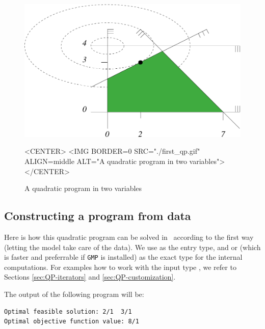\begin{figure}[htbp]
\begin{ccTexOnly}
\begin{center}
\includegraphics{QP_solver/first_qp} %
\end{center}
\end{ccTexOnly}

\begin{ccHtmlOnly}
<CENTER>
<IMG BORDER=0 SRC="./first_qp.gif" ALIGN=middle ALT="A quadratic program in two variables">
</CENTER>
\end{ccHtmlOnly}

\caption{A quadratic program in two variables
\label{fig:QP-first_qp}}
\end{figure}

\subsection{Constructing a program from data}
Here is how this quadratic program can be solved in \cgal\ 
according to the first way (letting the model take care of
the data). We use  as the entry type, and 
 or  (which is faster and preferrable if
\texttt{GMP} is installed) as the exact type for the
internal computations. For examples 
how to work with the input type , we refer to 
Sections \ref{sec:QP-iterators} and \ref{sec:QP-customization}.

The output of the following program will be:
\begin{verbatim}
Optimal feasible solution: 2/1  3/1
Optimal objective function value: 8/1
\end{verbatim}


